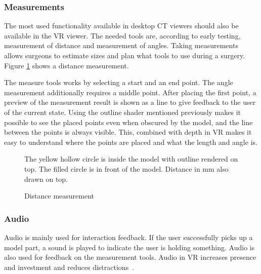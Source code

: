 \documentclass[a4paper]{report}
\begin{document}
\subsubsection{Measurements}
The most used functionality available in desktop CT viewers should also be available in the VR viewer. The needed tools are, according to early testing, measurement of distance and measurement of angles. Taking measurements allows surgeons to estimate sizes and plan what tools to use during a surgery.
Figure \ref{measure} shows a distance measurement.

The measure tools works by selecting a start and an end point. The angle measurement additionally requires a middle point.
After placing the first point, a preview of the measurement result is shown as a line to give feedback to the user of the current state.
Using the outline shader mentioned previously makes it possible to see the placed points even when obscured by the model, and the line between the points is always visible. This, combined with depth in VR makes it easy to understand where the points are placed and what the length and angle is.

\begin{figure}[h!]
    \centering
	\hfill
	\caption{Distance measurement}\label{measure}
  \small
  The yellow hollow circle is inside the model with outline rendered on top. The filled circle is in front of the model. Distance in mm also drawn on top.
\end{figure}

\subsubsection{Audio}
Audio is mainly used for interaction feedback. If the user successfully picks up a model part, a sound is played to indicate the user is holding something. Audio is also used for feedback on the measurement tools. Audio in VR increases presence and investment and reduces distractions~\cite{kern_audio_2020}.
\end{document}
